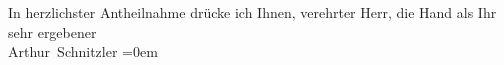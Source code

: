 \pstart
           In herzlichster Antheilnahme drücke ich Ihnen, verehrter Herr, die Hand als Ihr
               sehr ergebener{\\[\baselineskip]}\spacefill\mbox{Arthur Schnitzler}\pend
           \leftskip=0em{}\endnumbering{}  \newcommand{\dateiname}{L02318}\newcommand{\titel}{Arthur Schnitzler an Georg Engländer, 10. 1. 1919}\newcommand{\editorInnen}{Martin Anton Müller und Gerd-Hermann Susen}

